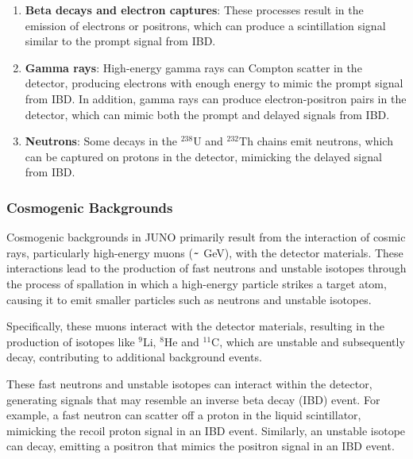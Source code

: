 \begin{enumerate}

	\item \textbf{Beta decays and electron captures}: These processes result in the emission of electrons or positrons, which can produce a scintillation signal similar to the prompt signal from IBD.

	\item \textbf{Gamma rays}: High-energy gamma rays can Compton scatter in the detector, producing electrons with enough energy to mimic the prompt signal from IBD. In addition, gamma rays can produce electron-positron pairs in the detector, which can mimic both the prompt and delayed signals from IBD.
	
	\item \textbf{Neutrons}: Some decays in the $^{238}\mathrm{U}$ and $^{232}\mathrm{Th}$ chains emit neutrons, which can be captured on protons in the detector, mimicking the delayed signal from IBD.

\end{enumerate}

\subsubsection*{Cosmogenic Backgrounds}

Cosmogenic backgrounds in JUNO primarily result from the interaction of cosmic rays, particularly high-energy muons ($\texttt{\string~}  $ GeV), with the detector materials. These interactions lead to the production of fast neutrons and unstable isotopes through the process of spallation in which a high-energy particle strikes a target atom, causing it to emit smaller particles such as neutrons and unstable isotopes. 

Specifically, these muons interact with the detector materials, resulting in the production of isotopes like  $^{9}\mathrm{Li}$, $^{8}\mathrm{He}$ and $^{11}\mathrm{C}$, which are unstable and subsequently decay, contributing to additional background events.

These fast neutrons and unstable isotopes can interact within the detector, generating signals that may resemble an inverse beta decay (IBD) event. For example, a fast neutron can scatter off a proton in the liquid scintillator, mimicking the recoil proton signal in an IBD event. Similarly, an unstable isotope can decay, emitting a positron that mimics the positron signal in an IBD event.



